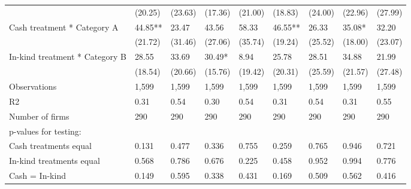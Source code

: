 \begin{table}[H]
{\begin{tabular}{lllllllll}
\hspace{1em} & (20.25) & (23.63) & (17.36) & (21.00) & (18.83) & (24.00) & (22.96) & (27.99)\\
\hspace{1em}Cash treatment * Category A & 44.85** & 23.47 & 43.56 & 58.33 & 46.55** & 26.33 & 35.08* & 32.20\\
\hspace{1em} & (21.72) & (31.46) & (27.06) & (35.74) & (19.24) & (25.52) & (18.00) & (23.07)\\
\hspace{1em}In-kind treatment * Category B & 28.55 & 33.69 & 30.49* & 8.94 & 25.78 & 28.51 & 34.88 & 21.99\\
\hspace{1em} & (18.54) & (20.66) & (15.76) & (19.42) & (20.31) & (25.59) & (21.57) & (27.48)\\
\hspace{1em}Observations & 1,599 & 1,599 & 1,599 & 1,599 & 1,599 & 1,599 & 1,599 & 1,599\\
\hspace{1em}R2 & 0.31 & 0.54 & 0.30 & 0.54 & 0.31 & 0.54 & 0.31 & 0.55\\
\hspace{1em}Number of firms & 290 & 290 & 290 & 290 & 290 & 290 & 290 & 290\\
\hspace{1em}p-values for testing: &  &  &  &  &  &  &  & \\
\hspace{1em}\hspace{1em} Cash treatments equal & 0.131 & 0.477 & 0.336 & 0.755 & 0.259 & 0.765 & 0.946 & 0.721\\
\hspace{1em}\hspace{1em} In-kind treatments equal & 0.568 & 0.786 & 0.676 & 0.225 & 0.458 & 0.952 & 0.994 & 0.776\\
\hspace{1em}\hspace{1em} Cash = In-kind & 0.149 & 0.595 & 0.338 & 0.431 & 0.169 & 0.509 & 0.562 & 0.416\\
\bottomrule
\end{tabular}}
\end{table}
